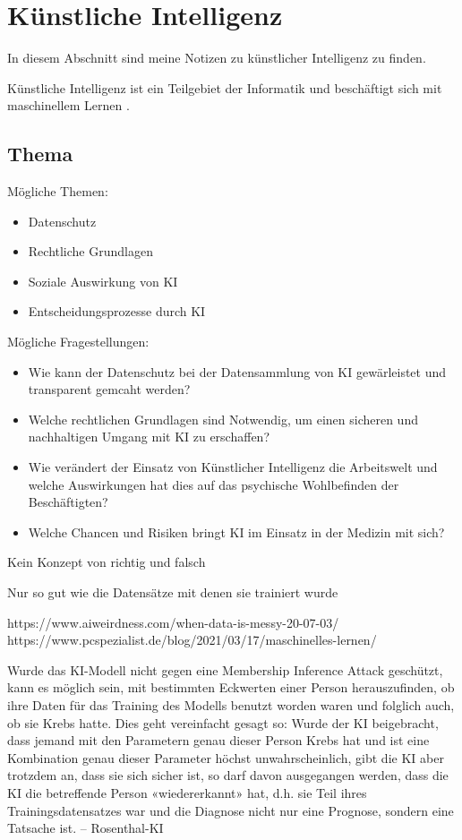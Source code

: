 \section{Künstliche Intelligenz}
\label{sec:ai}

In diesem Abschnitt sind meine Notizen zu künstlicher Intelligenz zu finden.

Künstliche Intelligenz ist ein Teilgebiet der Informatik und beschäftigt sich mit maschinellem Lernen \citep{ai-wikipedia}.
\newline

\subsection{Thema}
\setlength{\parindent}{0pt}
Mögliche Themen:
    \begin{itemize}
    \item Datenschutz
    \item Rechtliche Grundlagen
    \item Soziale Auswirkung von KI 
    \item Entscheidungsprozesse durch KI 
    \end{itemize}
Mögliche Fragestellungen:
    \begin{itemize}
    \item Wie kann der Datenschutz bei der Datensammlung von KI gewärleistet und transparent gemcaht werden?
    \item Welche rechtlichen Grundlagen sind Notwendig, um einen sicheren und nachhaltigen Umgang mit KI zu erschaffen?
    \item Wie verändert der Einsatz von Künstlicher Intelligenz die Arbeitswelt und welche Auswirkungen hat dies auf das psychische Wohlbefinden der Beschäftigten?
    \item Welche Chancen und Risiken bringt KI im Einsatz in der Medizin mit sich?
    \end{itemize}
\newpage

\begin{KI}
    \item Kein Konzept von richtig und falsch
    \item Nur so gut wie die Datensätze mit denen sie trainiert wurde
\end{KI}



https://www.aiweirdness.com/when-data-is-messy-20-07-03/
https://www.pcspezialist.de/blog/2021/03/17/maschinelles-lernen/

Wurde das KI-Modell nicht gegen
eine Membership Inference Attack geschützt, kann es möglich sein, mit bestimmten Eckwerten
einer Person herauszufinden, ob ihre Daten für das Training des Modells benutzt worden waren
und folglich auch, ob sie Krebs hatte. Dies geht vereinfacht gesagt so: Wurde der KI beigebracht,
dass jemand mit den Parametern genau dieser Person Krebs hat und ist eine Kombination genau
dieser Parameter höchst unwahrscheinlich, gibt die KI aber trotzdem an, dass sie sich sicher ist,
so darf davon ausgegangen werden, dass die KI die betreffende Person «wiedererkannt» hat, d.h.
sie Teil ihres Trainingsdatensatzes war und die Diagnose nicht nur eine Prognose, sondern eine
Tatsache ist. -- Rosenthal-KI



